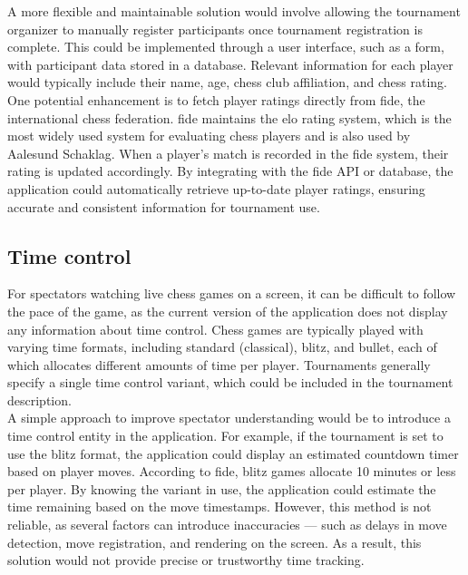A more flexible and maintainable solution would involve allowing the tournament organizer to manually register participants once tournament registration is complete. This could be implemented through a user interface, such as a form, with participant data stored in a database. Relevant information for each player would typically include their name, age, chess club affiliation, and chess rating. \\

One potential enhancement is to fetch player ratings directly from \gls{fide}, the international chess federation. \gls{fide} maintains the \gls{elo} rating system, which is the most widely used system for evaluating chess players and is also used by Aalesund Schaklag. When a player’s match is recorded in the \gls{fide} system, their rating is updated accordingly. By integrating with the \gls{fide} API or database, the application could automatically retrieve up-to-date player ratings, ensuring accurate and consistent information for tournament use.

\subsection{Time control}
For spectators watching live chess games on a screen, it can be difficult to follow the pace of the game, as the current version of the application does not display any information about time control. Chess games are typically played with varying time formats, including standard (classical), \gls{blitz}, and \gls{bullet}, each of which allocates different amounts of time per player. Tournaments generally specify a single time control variant, which could be included in the tournament description. \\

A simple approach to improve spectator understanding would be to introduce a time control entity in the application. For example, if the tournament is set to use the \gls{blitz} format, the application could display an estimated countdown timer based on player moves. According to \gls{fide}, blitz games allocate 10 minutes or less per player. By knowing the variant in use, the application could estimate the time remaining based on the move timestamps. However, this method is not reliable, as several factors can introduce inaccuracies — such as delays in move detection, move registration, and rendering on the screen. As a result, this solution would not provide precise or trustworthy time tracking. \\

